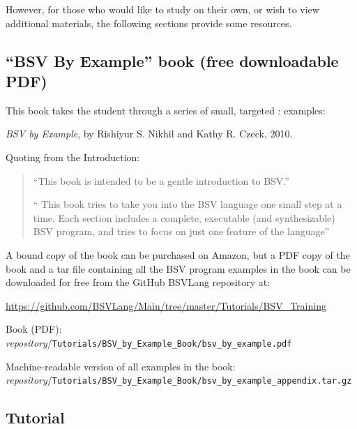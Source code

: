 However, for those who would like to study {\BSV} on their own, or
wish to view additional {\BSV} materials, the following sections
provide some resources.


\subsection{``BSV By Example'' book (free downloadable PDF)}

This book takes the student through a series of small, targeted {\BSV}:
examples:

\hm \emph{BSV by Example}, by Rishiyur S. Nikhil and Kathy R. Czeck, 2010.

Quoting from the Introduction:
\begin{quote}
``This book is intended to be a gentle introduction to BSV.''

`` This book tries to take you into the BSV language one small step at
a time. Each section includes a complete, executable (and
synthesizable) BSV program, and tries to focus on just one feature of
the language''
\end{quote}

A bound copy of the book can be purchased on Amazon, but a PDF copy of
the book and a tar file containing all the BSV program examples in the
book can be downloaded for free from the GitHub BSVLang repository at:

\url{https://github.com/BSVLang/Main/tree/master/Tutorials/BSV_Training}

\begin{tightlist}
  \item Book (PDF): \\
  \emph{repository}/\verb|Tutorials/BSV_by_Example_Book/bsv_by_example.pdf|

  \item Machine-readable version of all examples in the book: \\
  \emph{repository}/\verb|Tutorials/BSV_by_Example_Book/bsv_by_example_appendix.tar.gz|
\end{tightlist}


\subsection{{\BSV} Tutorial}

